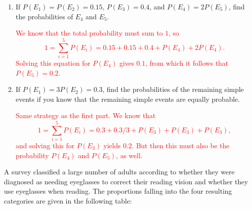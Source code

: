 \documentclass[12pt,reqno]{amsart}
\begin{document}
\medskip
\begin{enumerate}
    \item If $P(E_1) = P(E_2) = 0.15$, $P(E_3) = 0.4$, and $P(E_4) = 2P(E_5)$, find the probabilities of $E_4$ and $E_5$.
    
    \bigskip
    \textcolor{red}{We know that the total probability must sum to $1$, so
        \[1 = \sum_{i=1}^5P(E_i) = 0.15 + 0.15 + 0.4 + P(E_4) + 2P(E_4).\]
    Solving this equation for $P(E_4)$ gives $0.1$, from which it follows that $P(E_5)=0.2$.}
    \bigskip

    \item If $P(E_1) = 3P(E_2) = 0.3$, find the probabilities of the remaining simple events if you know that the remaining simple events are equally probable.
    
    \bigskip
    \textcolor{red}{Same strategy as the first part. We know that
        \[1 = \sum_{i=1}^5P(E_i) = 0.3 + 0.3/3 + P(E_3) + P(E_3) + P(E_3),\]
    and solving this for $P(E_3)$ yields $0.2$. But then this must also be the probability $P(E_4)$ and $P(E_5)$, as well.}
    
\end{enumerate}















\bigskip
\prob A survey classified a large number of adults according to whether they were diagnosed as needing eyeglasses to correct their reading vision and whether they use eyeglasses when reading. The proportions falling into the four resulting categories are given in the following table:
\end{document}
